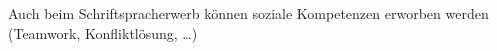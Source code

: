 Auch beim Schriftspracherwerb können soziale Kompetenzen erworben werden (Teamwork, Konfliktlösung, …)